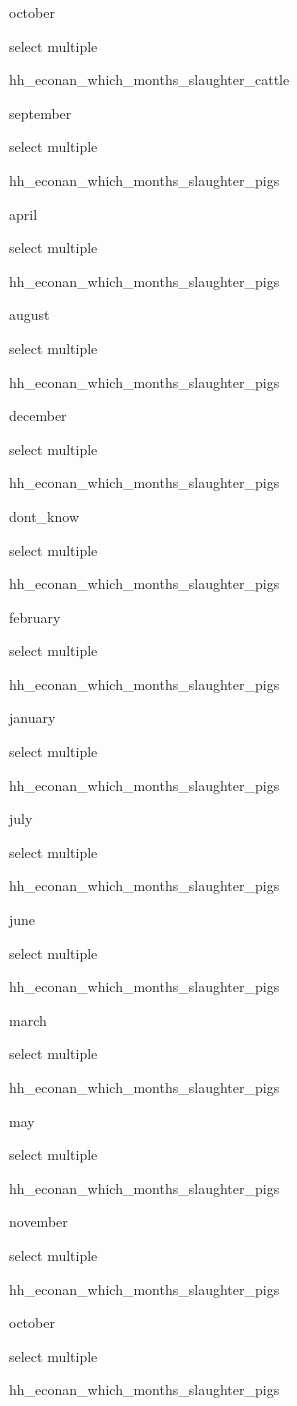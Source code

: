\documentclass[]{article}
\begin{document}
october

select multiple

hh\_econan\_which\_months\_slaughter\_cattle

september

select multiple

hh\_econan\_which\_months\_slaughter\_pigs

april

select multiple

hh\_econan\_which\_months\_slaughter\_pigs

august

select multiple

hh\_econan\_which\_months\_slaughter\_pigs

december

select multiple

hh\_econan\_which\_months\_slaughter\_pigs

dont\_know

select multiple

hh\_econan\_which\_months\_slaughter\_pigs

february

select multiple

hh\_econan\_which\_months\_slaughter\_pigs

january

select multiple

hh\_econan\_which\_months\_slaughter\_pigs

july

select multiple

hh\_econan\_which\_months\_slaughter\_pigs

june

select multiple

hh\_econan\_which\_months\_slaughter\_pigs

march

select multiple

hh\_econan\_which\_months\_slaughter\_pigs

may

select multiple

hh\_econan\_which\_months\_slaughter\_pigs

november

select multiple

hh\_econan\_which\_months\_slaughter\_pigs

october

select multiple

hh\_econan\_which\_months\_slaughter\_pigs
\end{document}
